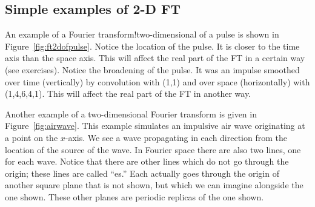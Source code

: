 \subsection{Simple examples of 2-D FT}
\par
An example of a 
    {Fourier transform!two-dimensional}
of a pulse is shown in Figure~\ref{fig:ft2dofpulse}.%
Notice the location of the pulse.
It is closer to the time axis than the space axis.
This will affect the real part of the FT in a certain way
(see exercises).
Notice the broadening of the pulse.
It was an impulse smoothed over time (vertically) by convolution
with (1,1) and over space (horizontally) with (1,4,6,4,1).
This will affect the real part of the FT in another way.
\par
Another example of a two-dimensional Fourier transform
is given in Figure~\ref{fig:airwave}.
This example simulates an impulsive air wave originating at a point
on the $x$-axis.
We see a wave propagating in each direction
from the location of the source of the wave.
In Fourier space there are also two lines, one for each wave.
Notice that there are other lines which do not go through the origin;
these lines are called ``es.''
Each actually goes through the origin
of another square plane that is not shown,
but which we can imagine alongside the one shown.
These other planes are periodic replicas of the one shown.%

